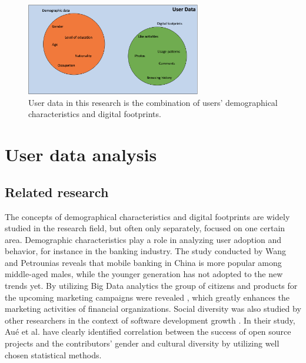 \begin{figure}[h] 
  \begin{center}
    \includegraphics[width=3in]{Images/user_data_venn.png}
    \caption{User data in this research is the combination of users' demographical characteristics and digital footprints.}
    \label{user_data_venn}
  \end{center}
\end{figure}

\section{User data analysis}
\subsection{Related research}
The concepts of demographical characteristics and digital footprints are widely studied in the research field, but often only separately, focused on one certain area. Demographic characteristics play a role in analyzing user adoption and behavior, for instance in the banking industry. The study conducted by Wang and Petrounias \cite{chinesemobilebankingusers} reveals that mobile banking in China is more popular among middle-aged males, while the younger generation has not adopted to the new trends yet. By utilizing Big Data analytics the group of citizens and products for the upcoming marketing campaigns were revealed \cite{chinesemobilebankingusers}, which greatly enhances the marketing activities of financial organizations. Social diversity was also studied by other researchers in the context of software development growth \cite{socialdiversityongithub}. In their study, Aué et al. \cite{socialdiversityongithub} have clearly identified correlation between the success of open source projects and the contributors' gender and cultural diversity by utilizing well chosen statistical methods. 

